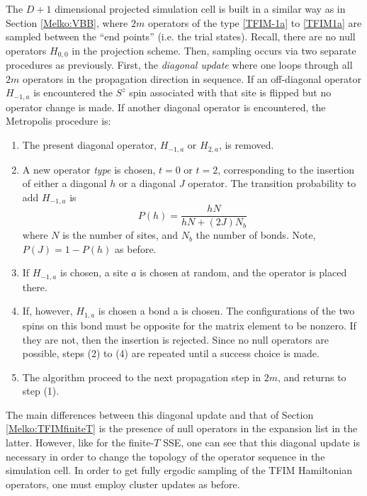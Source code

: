 \documentclass[vecphys]{svmult}
\begin{document}
The $D+1$ dimensional projected simulation cell is built in a similar way as in Section \ref{Melko:VBB}, where $2m$ operators of the type \ref{TFIM-1a} to \ref{TFIM1a}  are sampled between the ``end points'' (i.e. the trial states).  Recall, there are no null operators $H_{0,0}$ in the projection scheme.  Then, sampling occurs via two separate procedures as previously.  First, the {\em diagonal update} where one loops through all $2m$ operators in the propagation direction in sequence. If an off-diagonal operator $H_{-1,a}$ is encountered the $S^z$ spin associated with that site is flipped but no operator change is made.  If another diagonal operator is encountered, the Metropolis procedure is:
\begin{enumerate}
\item The present diagonal operator,  $H_{-1,a}$ or  $H_{2,a}$, is removed. 
\item A new operator {\em type} is chosen, $t=0$ or $t=2$, corresponding to the insertion of either a diagonal $h$ or a diagonal $J$ operator.  The transition probability to add $H_{-1,a}$ is 
\begin{equation}
P(h) = \frac{h N}{hN + (2J)N_b}
\end{equation}
where $N$ is the number of sites, and $N_b$ the number of bonds.  Note, $P(J) = 1- P(h)$ as before.  %
\item If $H_{-1,a}$ is chosen, a site $a$ is chosen at random, and the operator is placed there.
\item If, however, $H_{1,a}$ is chosen a {\rm bond} a is chosen.  The configurations of the two spins on this bond must be opposite for the matrix element to be nonzero.  If they are not, then the insertion is rejected.   Since no null operators are possible, steps (2) to (4) are repeated until a success choice is made.
\item The algorithm proceed to the next propagation step in $2m$, and returns to step (1).
\end{enumerate}
The main differences between this diagonal update and that of Section \ref{Melko:TFIMfiniteT} is the presence of null operators in the expansion list in the latter.  However, like for the finite-$T$ SSE, one can see that this diagonal update is necessary in order to change the topology of the operator sequence in the simulation cell.  In order to get fully ergodic sampling of the TFIM Hamiltonian operators, one must employ cluster updates as before.
\end{document}
